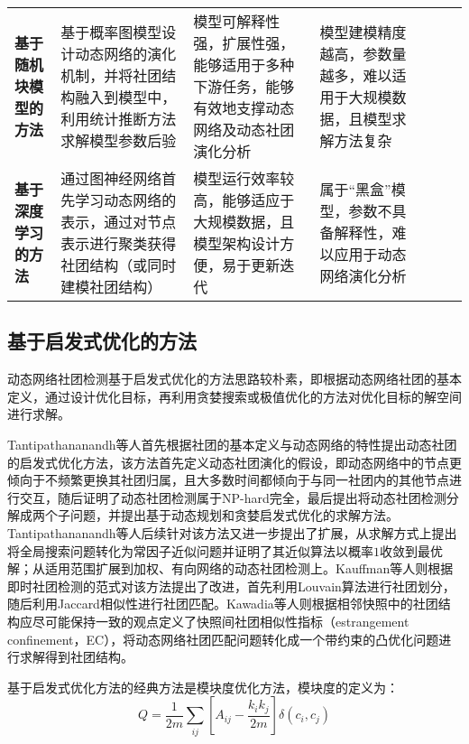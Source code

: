 \begin{table}[htbp]
{\begin{tabular}{lp{4cm}p{3cm}p{3cm}cp{2cm}}
			\textbf{基于随机块模型的方法} & 基于概率图模型设计动态网络的演化机制，并将社团结构融入到模型中，利用统计推断方法求解模型参数后验 & 模型可解释性强，扩展性强，能够适用于多种下游任务，能够有效地支撑动态网络及动态社团演化分析 & 模型建模精度越高，参数量越多，难以适用于大规模数据，且模型求解方法复杂 & ~\cite{yang2011detecting,xu2014dynamic,riverain2023poisson} \\
			\textbf{基于深度学习的方法} & 通过图神经网络首先学习动态网络的表示，通过对节点表示进行聚类获得社团结构（或同时建模社团结构） & 模型运行效率较高，能够适应于大规模数据，且模型架构设计方便，易于更新迭代 & 属于“黑盒”模型，参数不具备解释性，难以应用于动态网络演化分析 & ~\cite{goyal2020dyngraph2vec,hajiramezanali2019variational,mrabah2019deep} \\
			\bottomrule[1.5pt]
		\end{tabular}
	}
\end{table}

\subsection{基于启发式优化的方法}
动态网络社团检测基于启发式优化的方法思路较朴素，即根据动态网络社团的基本定义，通过设计优化目标，再利用贪婪搜索或极值优化的方法对优化目标的解空间进行求解。

Tantipathananandh等人\cite{tantipathananandh2007framework}首先根据社团的基本定义与动态网络的特性提出动态社团的启发式优化方法，该方法首先定义动态社团演化的假设，即动态网络中的节点更倾向于不频繁更换其社团归属，且大多数时间都倾向于与同一社团内的其他节点进行交互，随后证明了动态社团检测属于NP-hard完全，最后提出将动态社团检测分解成两个子问题，并提出基于动态规划和贪婪启发式优化的求解方法。Tantipathananandh等人后续针对该方法又进一步提出了扩展，从求解方式上提出将全局搜索问题转化为常因子近似问题并证明了其近似算法以概率$1$收敛到最优解\cite{tantipathananandh2009constant}；从适用范围扩展到加权、有向网络的动态社团检测上\cite{tantipathananandh2011finding}。Kauffman等人\cite{kauffman2014dyconet}则根据即时社团检测的范式对该方法提出了改进，首先利用Louvain算法进行社团划分，随后利用Jaccard相似性进行社团匹配。Kawadia等人\cite{kawadia2012sequential}则根据相邻快照中的社团结构应尽可能保持一致的观点定义了快照间社团相似性指标（estrangement confinement，EC），将动态网络社团匹配问题转化成一个带约束的凸优化问题进行求解得到社团结构。

基于启发式优化方法的经典方法是模块度优化方法，模块度\cite{newman2004finding}的定义为：
\[
Q = \frac{1}{2m} \sum_{ij} \left[ A_{ij} - \frac{k_i k_j}{2m} \right] \delta(c_i, c_j)
\]

